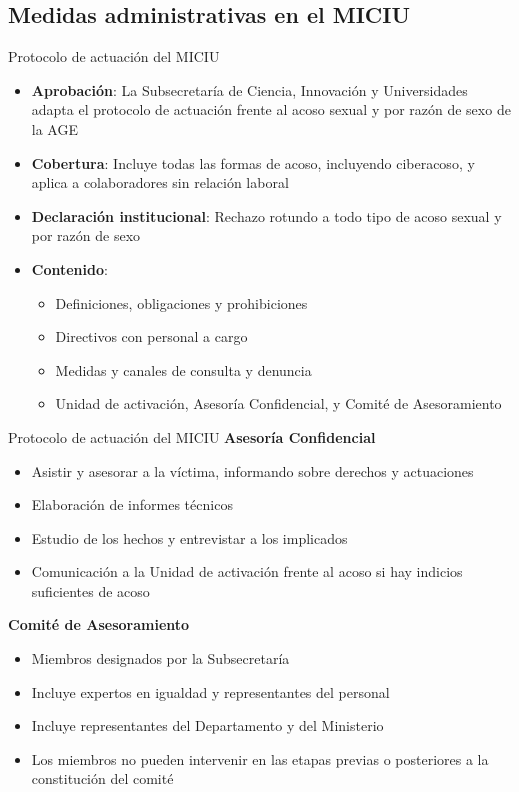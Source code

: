 \documentclass{beamer}
\begin{document}
    \subsection{Medidas administrativas en el MICIU}
    \begin{frame}{Protocolo de actuación del MICIU}
        \begin{itemize}
            \item \textbf{Aprobación}: La Subsecretaría de Ciencia, Innovación y Universidades adapta el protocolo de actuación frente al acoso sexual y por razón de sexo de la AGE
            \item \textbf{Cobertura}: Incluye todas las formas de acoso, incluyendo ciberacoso, y aplica a colaboradores sin relación laboral
            \item \textbf{Declaración institucional}: Rechazo rotundo a todo tipo de acoso sexual y por razón de sexo
            \item \textbf{Contenido}:
            \begin{itemize}
                \item Definiciones, obligaciones y prohibiciones
                \item Directivos con personal a cargo
                \item Medidas y canales de consulta y denuncia
                \item Unidad de activación, Asesoría Confidencial, y Comité de Asesoramiento
            \end{itemize}
        \end{itemize}
    \end{frame}

    \begin{frame}{Protocolo de actuación del MICIU}
        \textbf{Asesoría Confidencial}
        \begin{itemize}
            \item Asistir y asesorar a la víctima, informando sobre derechos y actuaciones
            \item Elaboración de informes técnicos
            \item Estudio de los hechos y entrevistar a los implicados
            \item Comunicación a la Unidad de activación frente al acoso si hay indicios suficientes de acoso
        \end{itemize}
        \textbf{Comité de Asesoramiento}
        \begin{itemize}
            \item Miembros designados por la Subsecretaría
            \item Incluye expertos en igualdad y representantes del personal
            \item Incluye representantes del Departamento y del Ministerio
            \item Los miembros no pueden intervenir en las etapas previas o posteriores a la constitución del comité
        \end{itemize}
    \end{frame}
\end{document}
